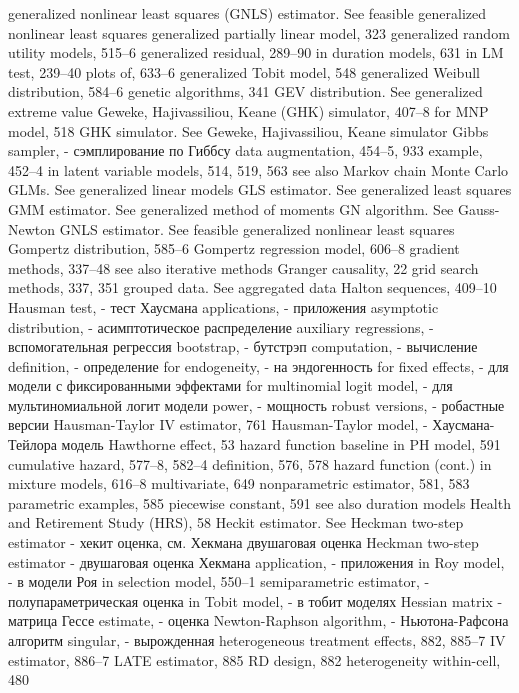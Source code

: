 generalized nonlinear least squares (GNLS) estimator.
See feasible generalized nonlinear least squares generalized partially linear model, 323
generalized random utility models, 515–6 generalized residual, 289–90
in duration models, 631 in LM test, 239–40 plots of, 633–6
generalized Tobit model, 548
generalized Weibull distribution, 584–6
genetic algorithms, 341
GEV distribution. See generalized extreme value Geweke, Hajivassiliou, Keane (GHK) simulator,
407–8
for MNP model, 518
GHK simulator. See Geweke, Hajivassiliou, Keane simulator
Gibbs sampler, - сэмплирование по Гиббсу
data augmentation, 454–5, 933 example, 452–4
in latent variable models, 514, 519, 563 see also Markov chain Monte Carlo
GLMs. See generalized linear models
GLS estimator. See generalized least squares
GMM estimator. See generalized method of moments GN algorithm. See Gauss-Newton
GNLS estimator. See feasible generalized nonlinear
least squares
Gompertz distribution, 585–6 Gompertz regression model, 606–8 gradient methods, 337–48
see also iterative methods Granger causality, 22
grid search methods, 337, 351 grouped data. See aggregated data
Halton sequences, 409–10 Hausman test, - тест Хаусмана
applications, - приложения
asymptotic distribution, - асимптотическое распределение
auxiliary regressions, - вспомогательная регрессия
bootstrap, - бутстрэп
computation, - вычисление 
definition, - определение
for endogeneity, - на эндогенность
for fixed effects, - для модели с фиксированными эффектами 
for multinomial logit model, - для мультиномиальной логит модели 
power, - мощность
robust versions, - робастные версии 
Hausman-Taylor IV estimator, 761 
Hausman-Taylor model, - Хаусмана-Тейлора модель 
Hawthorne effect, 53
hazard function
baseline in PH model, 591 cumulative hazard, 577–8, 582–4 definition, 576, 578
hazard function (cont.)
in mixture models, 616–8 multivariate, 649
nonparametric estimator, 581, 583 parametric examples, 585 piecewise constant, 591
see also duration models
Health and Retirement Study (HRS), 58
Heckit estimator. See Heckman two-step estimator - хекит оценка, см. Хекмана двушаговая оценка 
Heckman two-step estimator - двушаговая оценка Хекмана 
application, - приложения
in Roy model, - в модели Роя
in selection model, 550–1 
semiparametric estimator, - полупараметрическая оценка 
in Tobit model, - в тобит моделях
Hessian matrix - матрица Гессе
estimate, - оценка
Newton-Raphson algorithm, - Ньютона-Рафсона алгоритм 
singular, - вырожденная
heterogeneous treatment effects, 882, 885–7 IV estimator, 886–7
LATE estimator, 885
RD design, 882
heterogeneity
within-cell, 480
